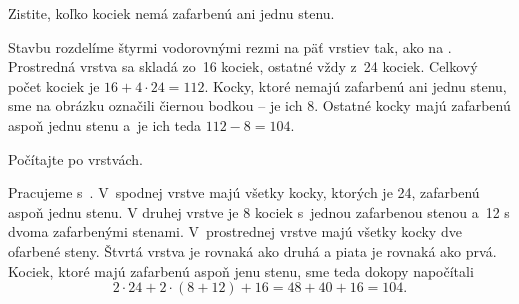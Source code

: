 {%
\napad
Zistite, koľko kociek nemá zafarbenú ani jednu stenu.

\riesenie
Stavbu rozdelíme štyrmi vodorovnými rezmi na päť vrstiev tak, ako na \obr{}. Prostredná vrstva sa skladá zo~16 kociek, ostatné vždy z~24 kociek.
Celkový počet kociek je $16 + 4\cdot 24 = 112$.
Kocky, ktoré nemajú zafarbenú ani jednu stenu, sme na obrázku označili čiernou bodkou -- je ich 8.
Ostatné kocky majú zafarbenú aspoň jednu stenu a~je ich teda
$112 - 8 = 104$.
%

\inynapad
Počítajte po vrstvách.

\ineriesenie
Pracujeme s~.
V~spodnej vrstve majú všetky kocky, ktorých je 24,
zafarbenú aspoň jednu stenu. V druhej vrstve je 8 kociek s~jednou zafarbenou stenou a~12 s dvoma zafarbenými stenami. V~prostrednej vrstve majú všetky kocky dve ofarbené steny.
Štvrtá vrstva je rovnaká ako druhá a piata je rovnaká ako prvá.
Kociek, ktoré majú zafarbenú aspoň jenu stenu, sme teda dokopy napočítali
$$
2\cdot 24 + 2\cdot (8 + 12) + 16 = 48+40+ 16 = 104.
$$
}

